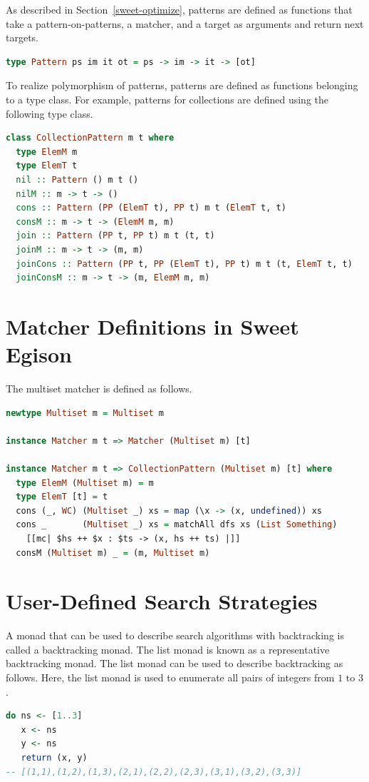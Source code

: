 As described in Section~\ref{sweet-optimize}, patterns are defined as functions that take a pattern-on-patterns, a matcher, and a target as arguments and return next targets.
\begin{lstlisting}[language=haskell,numbers=none]
type Pattern ps im it ot = ps -> im -> it -> [ot]
\end{lstlisting}
To realize polymorphism of patterns, patterns are defined as functions belonging to a type class.
For example, patterns for collections are defined using the following type class.
\begin{lstlisting}[language=haskell,numbers=none]
class CollectionPattern m t where
  type ElemM m
  type ElemT t
  nil :: Pattern () m t ()
  nilM :: m -> t -> ()
  cons :: Pattern (PP (ElemT t), PP t) m t (ElemT t, t)
  consM :: m -> t -> (ElemM m, m)
  join :: Pattern (PP t, PP t) m t (t, t)
  joinM :: m -> t -> (m, m)
  joinCons :: Pattern (PP t, PP (ElemT t), PP t) m t (t, ElemT t, t)
  joinConsM :: m -> t -> (m, ElemM m, m)
\end{lstlisting}

\section{Matcher Definitions in Sweet Egison}\label{sweet-matcher}

The multiset matcher is defined as follows.
\begin{lstlisting}[language=haskell,numbers=none]
newtype Multiset m = Multiset m

instance Matcher m t => Matcher (Multiset m) [t]

instance Matcher m t => CollectionPattern (Multiset m) [t] where
  type ElemM (Multiset m) = m
  type ElemT [t] = t
  cons (_, WC) (Multiset _) xs = map (\x -> (x, undefined)) xs
  cons _       (Multiset _) xs = matchAll dfs xs (List Something)
    [[mc| $hs ++ $x : $ts -> (x, hs ++ ts) |]]
  consM (Multiset m) _ = (m, Multiset m)
\end{lstlisting}

\section{User-Defined Search Strategies}\label{sweet-strategy}

A monad that can be used to describe search algorithms with backtracking is called a backtracking monad.
The list monad is known as a representative backtracking monad.
The list monad can be used to describe backtracking as follows.
Here, the list monad is used to enumerate all pairs of integers from $1$ to $3$.
\begin{lstlisting}[language=haskell,numbers=none]
do ns <- [1..3]
   x <- ns
   y <- ns
   return (x, y)
-- [(1,1),(1,2),(1,3),(2,1),(2,2),(2,3),(3,1),(3,2),(3,3)]
\end{lstlisting}

